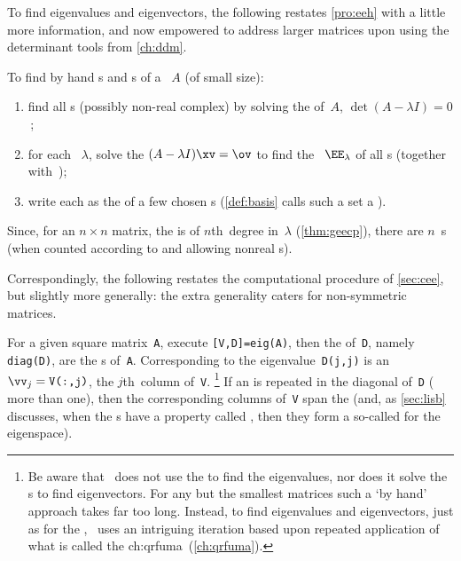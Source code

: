 To find eigenvalues and eigenvectors, the following restates \cref{pro:eeh} with a little more information, and now empowered to address larger matrices upon using the determinant tools from \cref{ch:ddm}.

\begin{procedure} \label{pro:geneig}
To find by hand s and s of a ~\(A\) (of small size):
\begin{enumerate}
\item find all s (possibly non-real complex) by solving the  of~\(A\), \(\det(A-\lambda I)=0\)\,;
\item for each ~\(\lambda\), solve the   \((A-\lambda I)\xv=\ov\) to find the ~\(\EE_\lambda\) of all s (together with~\ov);
\item write each  as the  of a few chosen s  (\cref{def:basis} calls such a set a ).
\end{enumerate}
Since, for an \(n\times n\) matrix, the  is of \(n\)th~degree in~\(\lambda\) (\cref{thm:geecp}), there are \(n\)~s (when counted according to  and allowing nonreal s).
\end{procedure}

Correspondingly, the following restates the computational procedure of \cref{sec:cee}, but slightly more generally: the extra generality caters for non-symmetric matrices.

\begin{compute}
For a given square matrix~\verb|A|, execute \verb|[V,D]=eig(A)|, then 
the  of~\verb|D|, namely \verb|diag(D)|, are the s of~\verb|A|. 
Corresponding to the eigenvalue~\verb|D(j,j)| is an   \(\vv_j=\verb|V(:,j)|\), the \(j\)th~column of~\verb|V|.%
\footnote{Be aware that \script\ does not use the  to find the eigenvalues, nor does it solve the s to find eigenvectors.  
For any but the smallest matrices such a `by hand' approach takes far too long.  
Instead, to find eigenvalues and eigenvectors, just as for the \svd, \script\ uses an intriguing iteration based upon repeated application of what is called the \ifcsname ch:qrfuma\endcsname\ (\cref{ch:qrfuma})\fi.}
If an  is repeated in the diagonal of~\verb|D| ( more than one), then the corresponding columns of~\verb|V| span the  
(and, as \cref{sec:lisb} discusses, when the s have a property called , then they form a so-called  for the eigenspace). 
\end{compute}



